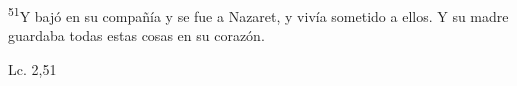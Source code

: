 \documentclass[../../rosario.tex]{subfiles}
\begin{document}
    \textsuperscript{51}Y bajó en su compañía y se fue a Nazaret, y vivía sometido a ellos. Y su madre guardaba todas estas
    cosas en su corazón.
    \begin{flushright}
    Lc. 2,51       
    \end{flushright} 
\end{document}
